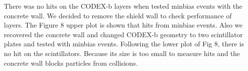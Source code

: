 There was no hits on the CODEX-b layers when tested minbias events with the concrete wall.
We decided to remove the shield wall to check performance of layers.
The Figure 8 upper plot is shown that hits from minbias events.
Also we recovered the concrete wall and changed CODEX-b geometry to two scintillator plates and tested with minbias events.
Following the lower plot of Fig 8, there is no hit on the scintillators.
Because its size is too small to measure hits and the concrete wall blocks particles from collisions.

